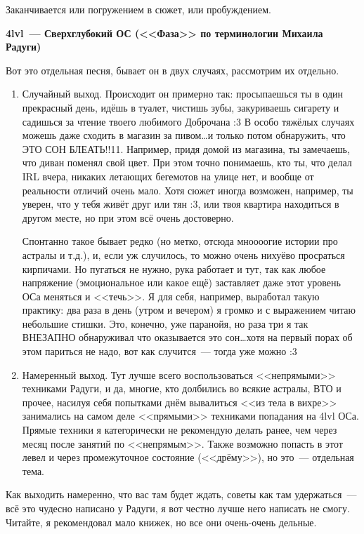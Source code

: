 \documentclass[a4paper,14pt,oneside]{memoir}
\begin{document}
Заканчивается или погружением в сюжет, или пробуждением.



\begin{center}
\textbf{4lvl~--- Сверхглубокий ОС (<<Фаза>> по терминологии Михаила Радуги)}
\end{center}


Вот это отдельная песня, бывает он в двух случаях, рассмотрим их отдельно.
\begin{enumerate}
\item Случайный выход. Происходит он примерно так: просыпаешься ты в один прекрасный день, идёшь в туалет, чистишь зубы, закуриваешь сигарету и садишься за чтение твоего любимого Доброчана :3 В особо тяжёлых случаях можешь даже сходить в магазин за пивом\ldots и только потом обнаружить, что ЭТО СОН БЛЕАТЬ!!11. Например, придя домой из магазина, ты замечаешь, что диван поменял свой цвет. При этом точно понимаешь, кто ты, что делал IRL вчера, никаких летающих бегемотов на улице нет, и вообще от реальности отличий очень мало. Хотя сюжет иногда возможен, например, ты уверен, что у тебя живёт друг или тян :3, или твоя квартира находиться в другом месте, но при этом всё очень достоверно.

Спонтанно такое бывает редко (но метко, отсюда мноооогие истории про астралы и т.д.), и, если уж случилось, то можно очень нихуёво просраться кирпичами. Но пугаться не нужно, рука работает и тут, так как любое напряжение (эмоциональное или какое ещё) заставляет даже этот уровень ОСа меняться и <<течь>>. Я для себя, например, выработал такую практику: два раза в день (утром и вечером) я громко и с выражением читаю небольшие стишки. Это, конечно, уже паранойя, но раза три я так ВНЕЗАПНО обнаруживал что оказывается это сон\ldots хотя на первый порах об этом париться не надо, вот как случится~--- тогда уже можно :3
\item Намеренный выход. Тут лучше всего воспользоваться <<не\-пря\-мы\-ми>> техниками Радуги, и да, многие, кто долбились во всякие астралы, ВТО и прочее, насилуя себя попытками днём вывалиться <<из тела в вихре>> занимались на самом деле <<прямыми>> техниками попадания на 4lvl ОСа. Прямые техники я категорически не рекомендую делать ранее, чем через месяц после занятий по <<непрямым>>. Также возможно попасть в этот левел и через промежуточное состояние (<<дрёму>>), но это~--- отдельная тема.
\end{enumerate} 
 
Как выходить намеренно, что вас там будет ждать, советы как там удержаться~--- всё это чудесно написано у Радуги, я вот честно лучше него написать не смогу. Читайте, я рекомендовал мало книжек, но все они очень-очень дельные.
\end{document}
